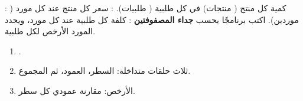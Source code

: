 \begin{statement}
: كمية كل منتج ( منتجات) في كل طلبية ( طلبيات). : سعر كل منتج عند كل مورد ( موردين). اكتب برنامجًا يحسب \textbf{جداء المصفوفتين} : كلفة كل طلبية عند كل مورد، ويحدد المورد الأرخص لكل طلبية.
\end{statement}
\begin{stepsbox}\begin{enumerate}
\item \par{\centering\scriptsize{}\par}.
\item ثلاث حلقات متداخلة: السطر، العمود، ثم المجموع.
\item الأرخص: مقارنة عمودي كل سطر.
\end{enumerate}\end{stepsbox}
